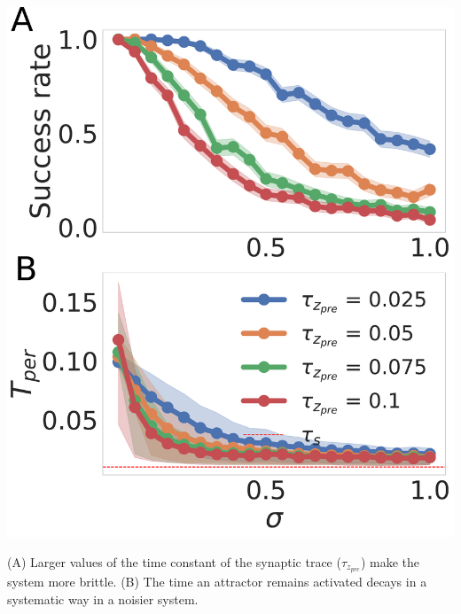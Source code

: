 \documentclass[portrait ,a4, final]{baposter}
\begin{document}
\begin{poster}
{\begin{center}
\includegraphics[scale=0.15]{noise_effects.pdf}

\smaller (A) Larger values of the time constant of the synaptic trace ($\tau_{z_{pre}}$) make the system more brittle. (B) The time an attractor remains activated decays in a systematic way in a noisier system. 
\end{center}
 
	
}

\end{poster}
\end{document}
